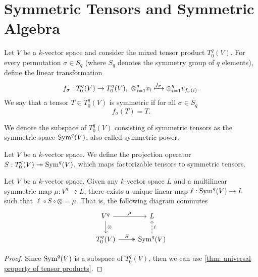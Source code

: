 \section{Symmetric Tensors and Symmetric Algebra}

\begin{definition}
    Let \(V\) be a \(k\)-vector space and consider the mixed tensor product
    \(T_0^q(V)\). For every permutation \(\sigma \in S_q\) (where
    \(S_q\) denotes the symmetry group of \(q\) elements), define the
    linear transformation
    \[
        f_\sigma: T_0^q(V) \to T_0^q(V),\ \otimes_{i=1}^q v_i \xmapsto{f_\sigma}
        \otimes_{i=1}^q v_{f_\sigma(i)}.
    \]
    We say that a tensor \(T \in T_0^q(V)\) is symmetric if for all \(\sigma \in S_q\)
    \[
        f_\sigma(T) = T.
    \]
\end{definition}

\begin{definition}
    We denote the subspace of \(T_0^q(V)\) consisting of symmetric tensors as the
    symmetric space \(\operatorname{Sym}^q(V)\), also called symmetric power.
\end{definition}

\begin{definition}
    Let \(V\) be a \(k\)-vector space. We define the projection operator \(S:
    T_0^q(V) \twoheadrightarrow \operatorname{Sym}^q(V)\), which maps factorizable tensors to symmetric tensors.
\end{definition}

\begin{proposition}
    Let \(V\) be a \(k\)-vector space. Given any \(k\)-vector space \(L\) and a
    multilinear symmetric map \(\mu: V^q \to L\), there exists a unique linear map
    \(\ell: \operatorname{Sym}^q(V) \to L\) such that \(\ell \circ S \circ \otimes = \mu\). That
    is, the following diagram commutes
    \[
        \begin{tikzcd}
            V^q \ar[r, "\mu"] \ar[d, "\otimes"] &L \\
            T_0^q(V) \ar[r, two heads, "S"] &\Sym^q(V) \ar[u, dashed, swap, "\ell"]
        \end{tikzcd}
    \]
\end{proposition}

\begin{proof}
    Since \(\operatorname{Sym}^q(V)\) is a subspace of \(T_0^q(V)\), then we can use
    \cref{thm: universal property of tensor products}.
\end{proof}

